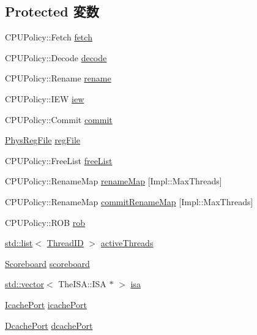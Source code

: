 \subsection*{Protected 変数}
\begin{DoxyCompactItemize}
\item 
CPUPolicy::Fetch \hyperlink{classFullO3CPU_ac41165b4dc11673a5e8f6c8679717c1b}{fetch}
\item 
CPUPolicy::Decode \hyperlink{classFullO3CPU_a21ddb57c5e4f70298cee97ee543e3bdb}{decode}
\item 
CPUPolicy::Rename \hyperlink{classFullO3CPU_a39ad9a464eaaff03051506711d40fc5f}{rename}
\item 
CPUPolicy::IEW \hyperlink{classFullO3CPU_afbb39e841c20e3affe28f4ca3e8c0992}{iew}
\item 
CPUPolicy::Commit \hyperlink{classFullO3CPU_a2cb9d36b31d8d38af97362bb47f6e930}{commit}
\item 
\hyperlink{classPhysRegFile}{PhysRegFile} \hyperlink{classFullO3CPU_aa760a1e4a392e8e5c1dd8ed85b9f56fe}{regFile}
\item 
CPUPolicy::FreeList \hyperlink{classFullO3CPU_ad5655f9bbf3c5b09877a612be7fc6b65}{freeList}
\item 
CPUPolicy::RenameMap \hyperlink{classFullO3CPU_a777805217a21e32ee39d1203bca3da53}{renameMap} \mbox{[}Impl::MaxThreads\mbox{]}
\item 
CPUPolicy::RenameMap \hyperlink{classFullO3CPU_a276327b80d93babf5512b90c6daae5e4}{commitRenameMap} \mbox{[}Impl::MaxThreads\mbox{]}
\item 
CPUPolicy::ROB \hyperlink{classFullO3CPU_ad649787f87175a89806eeccaee4832e9}{rob}
\item 
\hyperlink{classstd_1_1list}{std::list}$<$ \hyperlink{base_2types_8hh_ab39b1a4f9dad884694c7a74ed69e6a6b}{ThreadID} $>$ \hyperlink{classFullO3CPU_ae8939711cc7f6e9c795d16df91f9f258}{activeThreads}
\item 
\hyperlink{classScoreboard}{Scoreboard} \hyperlink{classFullO3CPU_a5e0ec8da05a369f0327b7b78c44faa36}{scoreboard}
\item 
\hyperlink{classstd_1_1vector}{std::vector}$<$ TheISA::ISA $\ast$ $>$ \hyperlink{classFullO3CPU_aa0d8dc5e214b94342d1f730e4e34ae82}{isa}
\item 
\hyperlink{classFullO3CPU_1_1IcachePort}{IcachePort} \hyperlink{classFullO3CPU_a290723656a84b9cc90dfce377af9aad0}{icachePort}
\item 
\hyperlink{classFullO3CPU_1_1DcachePort}{DcachePort} \hyperlink{classFullO3CPU_a38b03978ad7720fdc910ff6a8b44585f}{dcachePort}
\end{DoxyCompactItemize}
